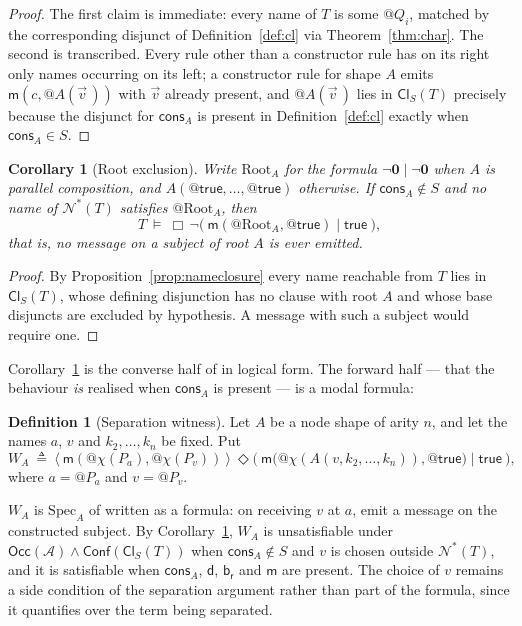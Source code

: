 \documentclass[11pt]{article}
\makeatletter
\theoremstyle{plain}
\newtheorem{corollary}[theorem]{Corollary}
\theoremstyle{definition}
\newtheorem{definition}[theorem]{Definition}
\theoremstyle{remark}
\newcommand{\quo}[1]{@#1}
\newcommand{\nil}{\mathbf{0}}
\newcommand{\nms}[1]{\mathcal{N}^{*}(#1)}
\newcommand{\mm}{\mathsf{m}}
\newcommand{\dd}{\mathsf{d}}
\newcommand{\br}{\mathsf{b}_{\mathsf{r}}}
\newcommand{\cons}{\mathsf{cons}}
\newcommand{\may}[1]{\langle #1 \rangle}
\newcommand{\sat}{\models}
\newcommand{\chf}[1]{\chi(#1)}
\newcommand{\Occ}{\mathsf{Occ}}
\newcommand{\Conf}{\mathsf{Conf}}
\newcommand{\Cl}{\mathsf{Cl}}
\newcommand{\Atm}{\mathcal{A}}
\makeatother
\begin{document}
\begin{proof}
The first claim is immediate: every name of $T$ is some $\quo{Q_i}$, matched by
the corresponding disjunct of Definition~\ref{def:cl} via
Theorem~\ref{thm:char}. The second is \cite[Lem.~9.1]{rhocomb3} transcribed.
Every rule other than a constructor rule has on its right only names occurring
on its left; a constructor rule for shape $A$ emits
$\mm(c,\quo{A(\vec v\,)})$ with $\vec v$ already present, and $\quo{A(\vec v\,)}$
lies in $\Cl_{S}(T)$ precisely because the disjunct for $\cons_{A}$ is present
in Definition~\ref{def:cl} exactly when $\cons_{A} \in S$.
\end{proof}

\begin{corollary}[Root exclusion]
\label{cor:root}
Write $\mathrm{Root}_{A}$ for the formula
$\neg\nil \mid \neg\nil$ when $A$ is parallel composition, and
$A(\quo{\mathsf{true}},\dots,\quo{\mathsf{true}})$ otherwise. If
$\cons_{A} \notin S$ and no name of $\nms{T}$ satisfies
$\quo{\mathrm{Root}_{A}}$, then
\[
  T \ \sat\ \Box\,\neg\big(\ \mm(\quo{\mathrm{Root}_{A}},\quo{\mathsf{true}})
  \mid \mathsf{true}\ \big),
\]
that is, no message on a subject of root $A$ is ever emitted.
\end{corollary}

\begin{proof}
By Proposition~\ref{prop:nameclosure} every name reachable from $T$ lies in
$\Cl_{S}(T)$, whose defining disjunction has no clause with root $A$ and whose
base disjuncts are excluded by hypothesis. A message with such a subject would
require one.
\end{proof}

Corollary~\ref{cor:root} is the converse half of
\cite[Prop.~9.5]{rhocomb3} in logical form. The forward half --- that the
behaviour \emph{is} realised when $\cons_{A}$ is present --- is a modal formula:

\begin{definition}[Separation witness]
\label{def:witness}
Let $A$ be a node shape of arity $n$, and let the names
$a$, $v$ and $k_2,\dots,k_n$ be fixed. Put
\[
  W_{A} \ \triangleq\ \may{\ \mm(\quo{\chf{P_a}},\quo{\chf{P_v}})\ }\
  \Diamond\Big(\ \mm\big(\quo{\chf{A(v,k_2,\dots,k_n)}},
  \quo{\mathsf{true}}\big) \mid \mathsf{true}\ \Big),
\]
where $a = \quo{P_a}$ and $v = \quo{P_v}$.
\end{definition}

$W_{A}$ is $\mathrm{Spec}_{A}$ of \cite[Def.~9.4]{rhocomb3} written as a
formula: on receiving $v$ at $a$, emit a message on the constructed subject. By
Corollary~\ref{cor:root}, $W_{A}$ is unsatisfiable under
$\Occ(\Atm) \wedge \Conf(\Cl_{S}(T))$ when $\cons_{A} \notin S$ and $v$ is
chosen outside $\nms{T}$, and it is satisfiable when $\cons_{A}$, $\dd$, $\br$
and $\mm$ are present. The choice of $v$ remains a side condition of the
separation argument rather than part of the formula, since it quantifies over
the term being separated.
\end{document}
